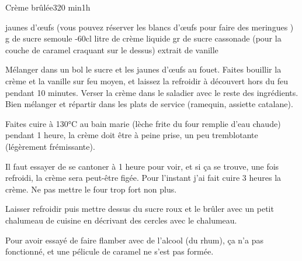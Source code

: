 \begin{recette}{Crème brûlée}{3}{20 min}{1h}
\begin{ingredients}[5 pers.]
 jaunes d'œufs (vous pouvez réserver les blancs d'œufs pour faire des meringues )
 g de sucre semoule
-60cl litre de crème liquide
 gr de sucre cassonade (pour la couche de caramel craquant sur le dessus)
\ingredient extrait de vanille
\end{ingredients}

\begin{preparation}
\etape Mélanger dans un bol le sucre et les jaunes d'œufs au fouet.
\etape Faites bouillir la crème et la vanille sur feu moyen, et laissez la refroidir à découvert hors du feu pendant 10 minutes.
\etape Verser la crème dans le saladier avec le reste des ingrédients.
\etape Bien mélanger et répartir dans les plats de service (ramequin, assiette catalane).
\end{preparation}

\begin{cuisson}
Faites cuire à 130°C au bain marie (lèche frite du four remplie d'eau chaude) pendant 1 heure, la crème doit être à peine prise, un peu tremblotante (légèrement frémissante). 
\begin{remarque}
Il faut essayer de se cantoner à 1 heure pour voir, et si ça se trouve, une fois refroidi, la crème sera peut-être figée. Pour l'instant j'ai fait cuire 3 heures la crème. Ne pas mettre le four trop fort non plus.
\end{remarque}

Laisser refroidir puis mettre dessus du sucre roux et le brûler avec un petit chalumeau de cuisine en décrivant des cercles avec le chalumeau. 
\begin{remarque}
Pour avoir essayé de faire flamber avec de l'alcool (du rhum), ça n'a pas fonctionné, et une pélicule de caramel ne s'est pas formée.
\end{remarque}

\end{cuisson}


\end{recette}

